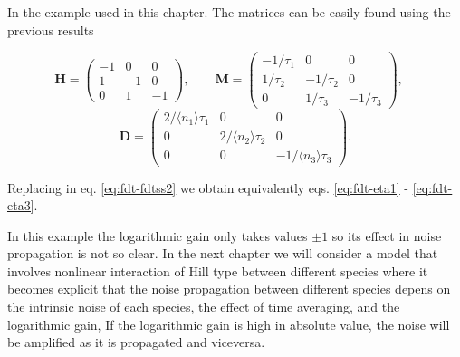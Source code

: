 In the example used in this chapter. The matrices can be easily found using the previous results

\begin{equation*}
  \mathbf{H} = \begin{pmatrix}
    -1 & 0 & 0 \\
    1 & -1 & 0 \\
    0 & 1 & -1
  \end{pmatrix},\quad\quad
  \mathbf{M} = \begin{pmatrix}
    -1/\tau_1 & 0 & 0 \\
    1/\tau_2 & -1/\tau_2 & 0 \\
    0 & 1/\tau_3 & -1/\tau_3
  \end{pmatrix},\quad  
\end{equation*}
\begin{equation*}
  \mathbf{D} = \begin{pmatrix}
    2/\langle n_1\rangle\tau_1 & 0 & 0 \\
    0 & 2/\langle n_2\rangle\tau_2 & 0 \\
    0 & 0 & -1/\langle n_3\rangle\tau_3
  \end{pmatrix}.
\end{equation*}

Replacing in eq. \eqref{eq:fdt-fdtss2} we obtain equivalently eqs. \eqref{eq:fdt-eta1} - \eqref{eq:fdt-eta3}.

In this example the logarithmic gain only takes values $\pm 1$ so its effect in noise propagation is not so clear. In the next chapter we will consider a model that involves nonlinear interaction of Hill type between different species where it becomes explicit that the noise propagation between different species depens on the intrinsic noise of each species, the effect of time averaging, and the logarithmic gain, If the logarithmic gain is high in absolute value, the noise will be amplified as it is propagated and viceversa.

